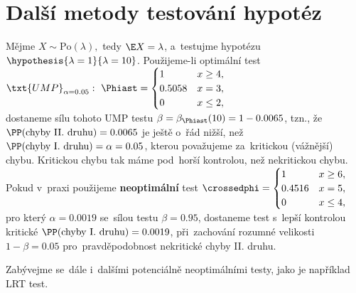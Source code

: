 \chapter{Další metody testování hypotéz}
\begin{example}
	Mějme $X\sim\mathrm{Po}(\lambda),$ tedy $\E X=\lambda$, a~testujme hypotézu \mbox{$\hypothesis{\lambda=1}{\lambda=10}$.} Použijeme-li optimální test
	$\txt{UMP}_{\alpha=0.05}:~\Phiast=\begin{cases}
	1&x\geq4,\\0.5058&x=3,\\0&x\leq2,
	\end{cases}$\\ dostaneme sílu tohoto UMP testu 
	$ \beta=\beta_{\Phiast}(10)=1-0.0065$, tzn., že $\PP(\text{chyby II. druhu})=0.0065 $ je ještě o~řád nižší, než $\PP(\text{chyby I. druhu})=\alpha=0.05$, kterou považujeme za~kritickou (vážnější) chybu. Kritickou chybu tak máme pod~horší kontrolou, než nekritickou chybu.
	\\Pokud v~praxi použijeme \textbf{neoptimální }test $\crossedphi=\begin{cases}
	1&x\geq6,\\0.4516&x=5,\\0&x\leq4,
	\end{cases}$\\
	pro který $\alpha=0.0019$ se~sílou testu $\beta=0.95$, dostaneme test s~lepší kontrolou kritické \mbox{$\PP(\text{chyby I. druhu})=0.0019 $}, při~zachování rozumné velikosti $1-\beta=0.05$ pro~pravděpodobnost nekritické chyby II. druhu. 
	
	Zabývejme se~dále i~dalšími potenciálně neoptimálními testy, jako je například LRT test. 
\end{example}
